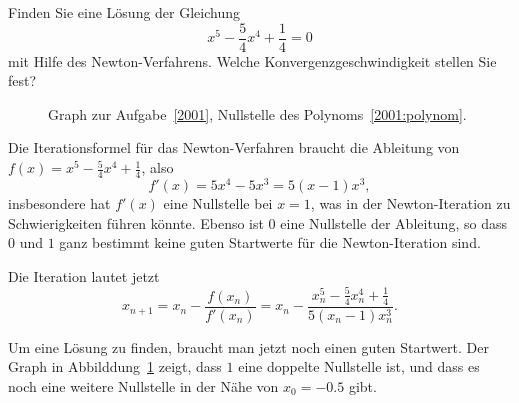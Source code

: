 Finden Sie eine Lösung der Gleichung
\begin{equation}
x^5 - \frac54x^4 +\frac14 = 0
\label{2001:polynom}
\end{equation}
mit Hilfe des Newton-Verfahrens.
Welche Konvergenzgeschwindigkeit stellen Sie fest?

\begin{loesung}
\begin{figure}
\centering
\def\skala{4}
\caption{Graph zur Aufgabe~\ref{2001}, Nullstelle des
Polynoms~\eqref{2001:polynom}.
\label{2001:figure}}
\end{figure}
Die Iterationsformel für das Newton-Verfahren braucht die Ableitung von
$f(x)=x^5-\frac54x^4+\frac14$, also
\[
f'(x)= 5x^4-5x^3 = 5(x-1)x^3,
\]
insbesondere hat $f'(x)$ eine Nullstelle bei $x=1$, was in der Newton-Iteration
zu Schwierigkeiten führen könnte.
Ebenso ist $0$ eine Nullstelle der Ableitung, so dass $0$ und $1$ ganz
bestimmt keine guten Startwerte für die Newton-Iteration sind.

Die Iteration lautet jetzt
\[
x_{n+1} = x_n - \frac{f(x_n)}{f'(x_n)}
=
x_n -\frac{x_n^5-\frac54x_n^4+\frac14}{5(x_n-1)x_n^3}.
\]

Um eine Lösung zu finden, braucht man jetzt noch einen guten Startwert.
Der Graph in Abbilddung~\ref{2001:figure} zeigt, dass $1$ eine doppelte
Nullstelle ist, und dass es noch eine weitere Nullstelle in der Nähe von
$x_0=-0.5$ gibt.


\end{loesung}
